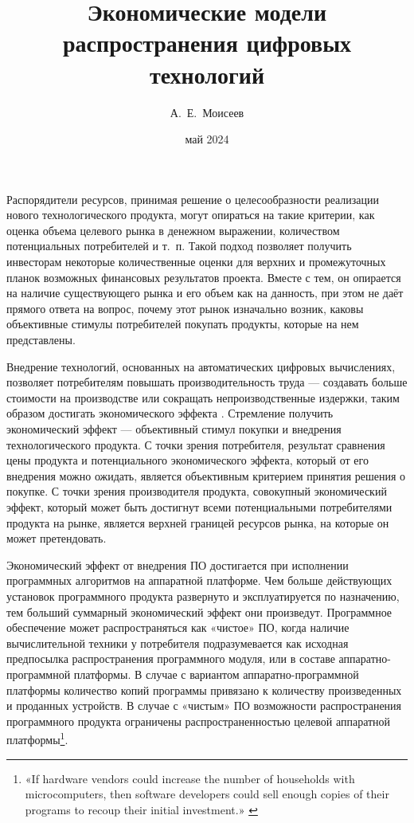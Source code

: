\documentclass{article}
\title{Экономические модели распространения цифровых технологий}
\author{А.~Е.~Моисеев}
\date{май 2024}
\begin{document}
\maketitle

Распорядители ресурсов, принимая решение о целесообразности реализации нового технологического продукта, могут опираться на такие критерии, как оценка объема целевого рынка в денежном выражении, количеством потенциальных потребителей и т.~п. Такой подход позволяет получить инвесторам некоторые количественные оценки для верхних и промежуточных планок возможных финансовых результатов проекта. Вместе с тем, он опирается на наличие существующего рынка и его объем как на данность, при этом не даёт прямого ответа на вопрос, почему этот рынок изначально возник, каковы объективные стимулы потребителей покупать продукты, которые на нем представлены.

Внедрение технологий, основанных на автоматических цифровых вычислениях, позволяет потребителям повышать производительность труда — создавать больше стоимости на производстве или сокращать непроизводственные издержки, таким образом достигать экономического эффекта \cite{ecoEffects}. Стремление получить экономический эффект — объективный стимул покупки и внедрения технологического продукта. С точки зрения потребителя, результат сравнения цены продукта и потенциального экономического эффекта, который от его внедрения можно ожидать, является объективным критерием принятия решения о покупке. С точки зрения производителя продукта, совокупный экономический эффект, который может быть достигнут всеми потенциальными потребителями продукта на рынке, является верхней границей ресурсов рынка, на которые он может претендовать.

Экономический эффект от внедрения ПО достигается при исполнении программных алгоритмов на аппаратной платформе. Чем больше действующих установок программного продукта развернуто и эксплуатируется по назначению, тем больший суммарный экономический эффект они произведут. Программное обеспечение может распространяться как «чистое» ПО, когда наличие вычислительной техники у потребителя подразумевается как исходная предпосылка распространения программного модуля, или в составе аппаратно-программной платформы. В случае с вариантом аппаратно-программной платформы количество копий программы привязано к количеству произведенных и проданных устройств. В случае с «чистым» ПО возможности распространения программного продукта ограничены распространенностью целевой аппаратной платформы\footnote{«If hardware vendors could increase the number of households with microcomputers, then software developers could sell enough copies of their programs to recoup their initial investment.» \cite{driscollOpenLetter}}.
\end{document}
